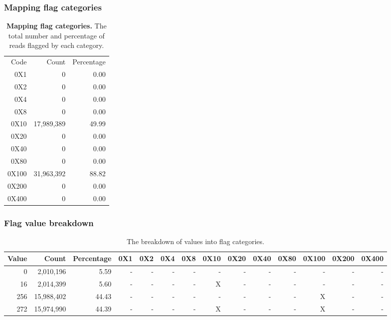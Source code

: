 \documentclass{article}
\begin{document}
\subsubsection{Mapping flag categories}
\begin{table}
\begin{tabular}{|r|r|r|}
  \hline
Code & Count & Percentage \\ 
  \rowcolor[gray]{0.9} \hline
0X1 &          0 &  0.00 \\ 
  0X2 &          0 &  0.00 \\ 
   \rowcolor[gray]{0.9}0X4 &          0 &  0.00 \\ 
  0X8 &          0 &  0.00 \\ 
   \rowcolor[gray]{0.9}0X10 & 17,989,389 & 49.99 \\ 
  0X20 &          0 &  0.00 \\ 
   \rowcolor[gray]{0.9}0X40 &          0 &  0.00 \\ 
  0X80 &          0 &  0.00 \\ 
   \rowcolor[gray]{0.9}0X100 & 31,963,392 & 88.82 \\ 
  0X200 &          0 &  0.00 \\ 
   \rowcolor[gray]{0.9}0X400 &          0 &  0.00 \\ 
   \hline
\end{tabular}\caption{\textbf{Mapping flag categories.} The total number and percentage of reads flagged by each category.}
\end{table}

\subsubsection{Flag value breakdown}
\begin{center}
{\tiny
\begin{longtable}{|r|r|r|r|r|r|r|r|r|r|r|r|r|r|}
\caption{The breakdown of values into flag categories.} \\ 
  \hline
Value & Count & Percentage & 0X1 & 0X2 & 0X4 & 0X8 & 0X10 & 0X20 & 0X40 & 0X80 & 0X100 & 0X200 & 0X400 \\ 
  \hline
0 &  2,010,196 &  5.59 & - & - & - & - & - & - & - & - & - & - & - \\ 
   \rowcolor[gray]{0.9}16 &  2,014,399 &  5.60 & - & - & - & - & X & - & - & - & - & - & - \\ 
  256 & 15,988,402 & 44.43 & - & - & - & - & - & - & - & - & X & - & - \\ 
   \rowcolor[gray]{0.9}272 & 15,974,990 & 44.39 & - & - & - & - & X & - & - & - & X & - & - \\ 
   \hline
\hline
\end{longtable}
}\end{center}
\end{document}
